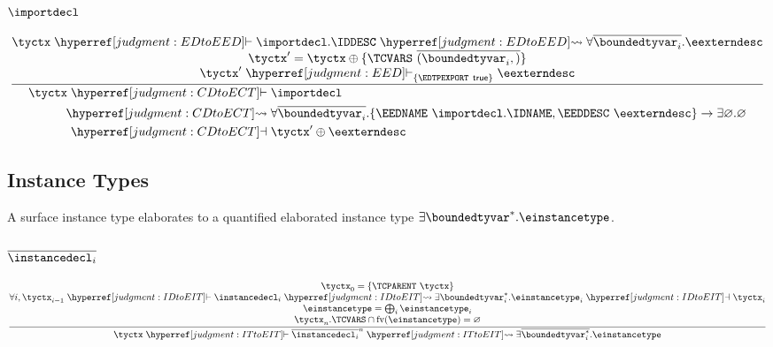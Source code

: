 \subsubsection{$\importdecl$}
\[
  \frac{
    \begin{array}{@{}c@{}}
      \tyctx \vdashh!EDtoEED! \importdecl.\IDDESC \leadstoh!EDtoEED! \forall\overline{\boundedtyvar_i}. \eexterndesc\\
      \tyctx' = \tyctx \oplus \{ \TCVARS~\overline{(\boundedtyvar_i,)} \}\\
      \tyctx' \vdashh!EED!_{\{\EDTPEXPORT~\true\}} \eexterndesc\\
    \end{array}
  }{
    \begin{aligned}
    \tyctx \vdashh!CDtoECT!{}&\importdecl\\
     \leadstoh!CDtoECT!{}&\forall\overline{\boundedtyvar_i}. \{\EEDNAME~\importdecl.\IDNAME, \EEDDESC~\eexterndesc\} \to \exists \varnothing. \varnothing\\
    \dashvh!CDtoECT!{}&\tyctx' \oplus \eexterndesc
    \end{aligned}
  }
\]

\subsection{Instance Types}
\label{judgment:ITtoEIT}

A surface instance type elaborates to a quantified elaborated instance
type $\exists \boundedtyvar^\ast. \einstancetype$.

\subsubsection{$\overline{\instancedecl_i}$}
\[
  \frac{
    \begin{array}{@{}c@{}}
      \tyctx_0 = \{ \TCPARENT~\tyctx \}\\
      \forall i, \tyctx_{i-1} \vdashh!IDtoEIT! \instancedecl_i
      \leadstoh!IDtoEIT! \exists \boundedtyvar^\ast_i. \einstancetype_i \dashvh!IDtoEIT! \tyctx_i\\
      \einstancetype = \bigoplus_i {\einstancetype}_i \\
      \tyctx_n.\TCVARS \cap \freeVars{\einstancetype} = \varnothing\\
    \end{array}
  }{
    \tyctx \vdashh!ITtoEIT! \overline{\instancedecl_i}^n
    \leadstoh!ITtoEIT! \exists \overline{\boundedtyvar^\ast_i}. \einstancetype
  }
\]

